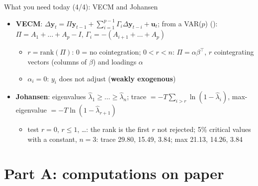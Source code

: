 \begin{frame}{What you need today (4/4): VECM and Johansen}
\itemsize{\small}
\begin{itemize}
    \item \textbf{VECM}: $\Delta\mathbf y_t = \Pi\mathbf y_{t-1} + \sum_{i=1}^{p-1}\Gamma_i\Delta\mathbf y_{t-i} + \mathbf u_t$; from a VAR($p$) (): $\Pi = A_1 + \dots + A_p - I$, $\Gamma_i = -(A_{i+1} + \dots + A_p)$
    \begin{itemize}
        \item $r = \mathrm{rank}(\Pi)$: 0 = no cointegration; $0 < r < n$: $\Pi = \alpha\beta^\top$, $r$ cointegrating vectors (columns of $\beta$) and loadings $\alpha$
        \item $\alpha_i = 0$: $y_i$ does not adjust (\textbf{weakly exogenous})
    \end{itemize}
    \item \textbf{Johansen}: eigenvalues $\hat\lambda_1 \ge \dots \ge \hat\lambda_n$; trace $= -T\sum_{i>r}\ln(1 - \hat\lambda_i)$, max-eigenvalue $= -T\ln(1 - \hat\lambda_{r+1})$
    \begin{itemize}
        \item test $r = 0$, $r \le 1$, \dots: the rank is the first $r$ not rejected; 5\% critical values with a constant, $n = 3$: trace 29.80, 15.49, 3.84; max 21.13, 14.26, 3.84
    \end{itemize}
\end{itemize}
\end{frame}


\section{Part A: computations on paper}

